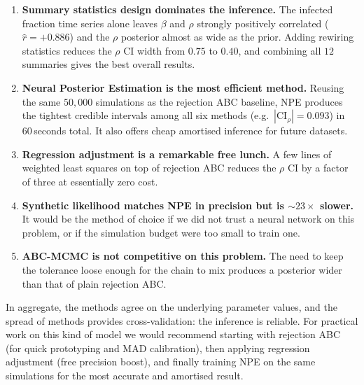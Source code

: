 \documentclass[11pt]{article}
\begin{document}
\begin{enumerate}[nosep, leftmargin=10pt]
\item \textbf{Summary statistics design dominates the inference.} The infected fraction time series alone leaves $\beta$ and $\rho$ strongly positively correlated ($\hat r = +0.886$) and the $\rho$ posterior almost as wide as the prior. Adding rewiring statistics reduces the $\rho$ CI width from $0.75$ to $0.40$, and combining all $12$ summaries gives the best overall results.
\item \textbf{Neural Posterior Estimation is the most efficient method.} Reusing the same $50{,}000$ simulations as the rejection ABC baseline, NPE produces the tightest credible intervals among all six methods (e.g.\ $|\text{CI}_\rho| = 0.093$) in $60\,$seconds total. It also offers cheap amortised inference for future datasets.
\item \textbf{Regression adjustment is a remarkable free lunch.} A few lines of weighted least squares on top of rejection ABC reduces the $\rho$ CI by a factor of three at essentially zero cost.
\item \textbf{Synthetic likelihood matches NPE in precision but is ${\sim}23\times$ slower.} It would be the method of choice if we did not trust a neural network on this problem, or if the simulation budget were too small to train one.
\item \textbf{ABC-MCMC is not competitive on this problem.} The need to keep the tolerance loose enough for the chain to mix produces a posterior wider than that of plain rejection ABC.
\end{enumerate}

\noindent In aggregate, the methods agree on the underlying parameter values, and the spread of methods provides cross-validation: the inference is reliable. For practical work on this kind of model we would recommend starting with rejection ABC (for quick prototyping and MAD calibration), then applying regression adjustment (free precision boost), and finally training NPE on the same simulations for the most accurate and amortised result.



\end{document}
